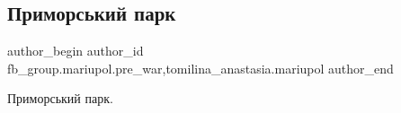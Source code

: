  
 
 
 
 

\subsection{Приморський парк}
\label{sec:10_02_2023.fb.fb_group.mariupol.pre_war.2.primorskii_park}
 
\ifcmt
 author_begin
   author_id fb_group.mariupol.pre_war,tomilina_anastasia.mariupol
 author_end
\fi

Приморський парк.
